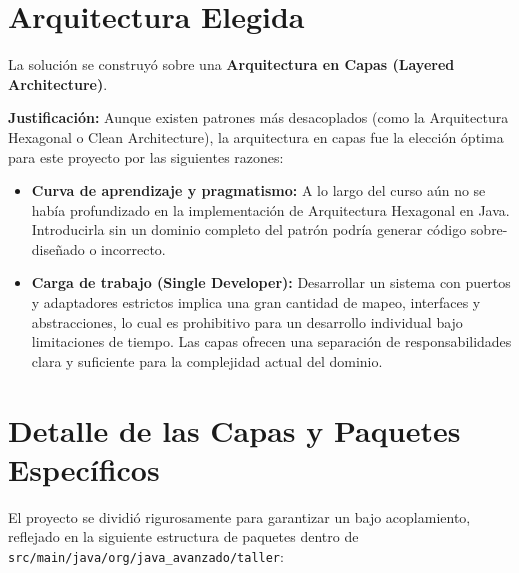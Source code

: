 \documentclass[12pt, a4paper]{article}
\begin{document}
\section{Arquitectura Elegida}
La solución se construyó sobre una \textbf{Arquitectura en Capas (Layered Architecture)}.

\textbf{Justificación:} Aunque existen patrones más desacoplados (como la Arquitectura Hexagonal o Clean Architecture), la arquitectura en capas fue la elección óptima para este proyecto por las siguientes razones:
\begin{itemize}
    \item \textbf{Curva de aprendizaje y pragmatismo:} A lo largo del curso aún no se había profundizado en la implementación de Arquitectura Hexagonal en Java. Introducirla sin un dominio completo del patrón podría generar código sobre-diseñado o incorrecto.
    \item \textbf{Carga de trabajo (Single Developer):} Desarrollar un sistema con puertos y adaptadores estrictos implica una gran cantidad de mapeo, interfaces y abstracciones, lo cual es prohibitivo para un desarrollo individual bajo limitaciones de tiempo. Las capas ofrecen una separación de responsabilidades clara y suficiente para la complejidad actual del dominio.
\end{itemize}

\section{Detalle de las Capas y Paquetes Específicos}
El proyecto se dividió rigurosamente para garantizar un bajo acoplamiento, reflejado en la siguiente estructura de paquetes dentro de \texttt{src/main/java/org/java\_avanzado/taller}:
\end{document}
